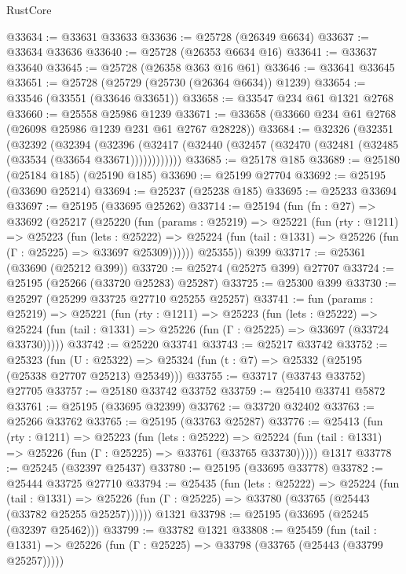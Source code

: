 \begin{lexlean}{RustCore}
\begin{coremodule}
@33634 := @33631 @33633
@33636 := @25728 (@26349 @6634)
@33637 := @33634 @33636
@33640 := @25728 (@26353 @6634 @16)
@33641 := @33637 @33640
@33645 := @25728 (@26358 @363 @16 @61)
@33646 := @33641 @33645
@33651 := @25728 (@25729 (@25730 (@26364 @6634)) @1239)
@33654 := @33546 (@33551 (@33646 @33651))
@33658 := @33547 @234 @61 @1321 @2768
@33660 := @25558 @25986 @1239
@33671 := @33658 (@33660 @234 @61 @2768 (@26098 @25986 @1239 @231 @61 @2767 @28228))
@33684 := @32326
    (@32351
      (@32392
        (@32394
          (@32396 (@32417 (@32440 (@32457 (@32470 (@32481 (@32485 (@33534 (@33654 @33671))))))))))))
@33685 := @25178 @185
@33689 := @25180 (@25184 @185) (@25190 @185)
@33690 := @25199 @27704
@33692 := @25195 (@33690 @25214)
@33694 := @25237 (@25238 @185)
@33695 := @25233 @33694
@33697 := @25195 (@33695 @25262)
@33714 := @25194
    (fun (fn : @27) =>
    @33692
      (@25217
        (@25220
          (fun (params : @25219) =>
          @25221
            (fun (rty : @1211) =>
            @25223
              (fun (lets : @25222) =>
              @25224 (fun (tail : @1331) => @25226 (fun (Γ : @25225) => @33697 @25309))))))
        @25355))
    @399
@33717 := @25361 (@33690 (@25212 @399))
@33720 := @25274 (@25275 @399) @27707
@33724 := @25195 (@25266 (@33720 @25283) @25287)
@33725 := @25300 @399
@33730 := @25297 (@25299 @33725 @27710 @25255 @25257)
@33741 := fun (params : @25219) =>
  @25221
    (fun (rty : @1211) =>
    @25223
      (fun (lets : @25222) =>
      @25224 (fun (tail : @1331) => @25226 (fun (Γ : @25225) => @33697 (@33724 @33730)))))
@33742 := @25220 @33741
@33743 := @25217 @33742
@33752 := @25323
    (fun (U : @25322) => @25324 (fun (t : @7) => @25332 (@25195 (@25338 @27707 @25213) @25349)))
@33755 := @33717 (@33743 @33752) @27705
@33757 := @25180 @33742 @33752
@33759 := @25410 @33741 @5872
@33761 := @25195 (@33695 @32399)
@33762 := @33720 @32402
@33763 := @25266 @33762
@33765 := @25195 (@33763 @25287)
@33776 := @25413
    (fun (rty : @1211) =>
    @25223
      (fun (lets : @25222) =>
      @25224 (fun (tail : @1331) => @25226 (fun (Γ : @25225) => @33761 (@33765 @33730)))))
    @1317
@33778 := @25245 (@32397 @25437)
@33780 := @25195 (@33695 @33778)
@33782 := @25444 @33725 @27710
@33794 := @25435
    (fun (lets : @25222) =>
    @25224
      (fun (tail : @1331) =>
      @25226 (fun (Γ : @25225) => @33780 (@33765 (@25443 (@33782 @25255 @25257))))))
    @1321
@33798 := @25195 (@33695 (@25245 (@32397 @25462)))
@33799 := @33782 @1321
@33808 := @25459
    (fun (tail : @1331) => @25226 (fun (Γ : @25225) => @33798 (@33765 (@25443 (@33799 @25257)))))

\end{coremodule}
\end{lexlean}
